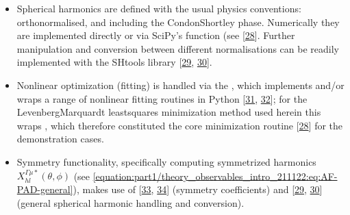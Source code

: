 \documentclass[letterpaper,table,10pt,english]{jupyterBook}
\begin{document}
\begin{itemize}
\item {} 
\sphinxAtStartPar
Spherical harmonics are defined with the usual physics conventions: orthonormalised, and including the Condon\sphinxhyphen{}Shortley phase. Numerically they are implemented directly or via SciPy’s  function (see  {[}\hyperlink{cite.backmatter/bibliography:id786}{28}{]}. Further manipulation and conversion between different normalisations can be readily implemented with the SHtools library {[}\hyperlink{cite.backmatter/bibliography:id858}{29}, \hyperlink{cite.backmatter/bibliography:id796}{30}{]}.

\item {} 
\sphinxAtStartPar
Non\sphinxhyphen{}linear optimization (fitting) is handled via the , which implements and/or wraps a range of non\sphinxhyphen{}linear fitting routines in Python {[}\hyperlink{cite.backmatter/bibliography:id687}{31}, \hyperlink{cite.backmatter/bibliography:id726}{32}{]}; for the Levenberg\sphinxhyphen{}Marquardt least\sphinxhyphen{}squares minimization method used herein this wraps , which therefore constituted the core minimization routine {[}\hyperlink{cite.backmatter/bibliography:id786}{28}{]} for the demonstration cases.

\item {} 
\sphinxAtStartPar
Symmetry functionality, specifically computing symmetrized harmonics \(X_{hl}^{\Gamma\mu*}(\theta,\phi)\) (see \eqref{equation:part1/theory_observables_intro_211122:eq:AF-PAD-general}), makes use of  {[}\hyperlink{cite.backmatter/bibliography:id639}{33}, \hyperlink{cite.backmatter/bibliography:id640}{34}{]} (symmetry coefficients) and  {[}\hyperlink{cite.backmatter/bibliography:id858}{29}, \hyperlink{cite.backmatter/bibliography:id796}{30}{]} (general spherical harmonic handling and conversion).

\end{itemize}
\end{document}

